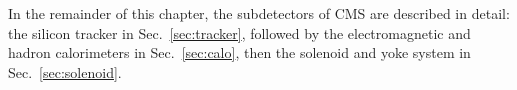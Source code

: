 
In the remainder of this chapter, the subdetectors of CMS are described in detail:
the silicon tracker in Sec.~\ref{sec:tracker},
followed by the electromagnetic and hadron calorimeters in Sec.~\ref{sec:calo},
then the solenoid and yoke system in Sec.~\ref{sec:solenoid}.

